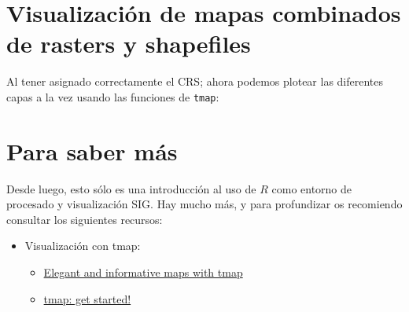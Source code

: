 \documentclass[
  letterpaper,
  DIV=11,
  numbers=noendperiod]{scrreprt}
\newenvironment{Shaded}{\begin{snugshade}}{\end{snugshade}}
\newcommand{\AttributeTok}[1]{\textcolor[rgb]{0.40,0.45,0.13}{#1}}
\newcommand{\CommentTok}[1]{\textcolor[rgb]{0.37,0.37,0.37}{#1}}
\newcommand{\FloatTok}[1]{\textcolor[rgb]{0.68,0.00,0.00}{#1}}
\newcommand{\FunctionTok}[1]{\textcolor[rgb]{0.28,0.35,0.67}{#1}}
\newcommand{\NormalTok}[1]{\textcolor[rgb]{0.00,0.23,0.31}{#1}}
\newcommand{\SpecialCharTok}[1]{\textcolor[rgb]{0.37,0.37,0.37}{#1}}
\newcommand{\StringTok}[1]{\textcolor[rgb]{0.13,0.47,0.30}{#1}}
\providecommand{\tightlist}{%
  \setlength{\itemsep}{0pt}\setlength{\parskip}{0pt}}\usepackage{longtable,booktabs,array}
\begin{document}
\hypertarget{visualizaciuxf3n-de-mapas-combinados-de-rasters-y-shapefiles}{%
\section{Visualización de mapas combinados de rasters y
shapefiles}\label{visualizaciuxf3n-de-mapas-combinados-de-rasters-y-shapefiles}}

Al tener asignado correctamente el CRS; ahora podemos plotear las
diferentes capas a la vez usando las funciones de \texttt{tmap}:

\begin{Shaded}
\end{Shaded}

\hypertarget{para-saber-muxe1s-3}{%
\section{Para saber más}\label{para-saber-muxe1s-3}}

Desde luego, esto sólo es una introducción al uso de \(R\) como entorno
de procesado y visualización SIG. Hay mucho más, y para profundizar os
recomiendo consultar los siguientes recursos:

\begin{itemize}
\tightlist
\item
  Visualización con tmap:

  \begin{itemize}
  \tightlist
  \item
    \href{https://r-tmap.github.io/tmap-book/index.html}{Elegant and
    informative maps with tmap}
  \item
    \href{https://cran.r-project.org/web/packages/tmap/vignettes/tmap-getstarted.html}{tmap:
    get started!}
  \end{itemize}
\end{itemize}
\end{document}
